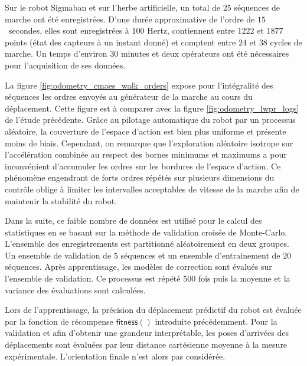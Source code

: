 Sur le robot Sigmaban et sur l'herbe artificielle, un total de $25$ séquences de marche
ont été enregistrées.
D'une durée approximative de l'ordre de $15$~secondes, elles sont enregistrées à $100$ Hertz, 
contiennent entre $1222$ et $1877$ points (état des capteurs à un instant donné) 
et comptent entre $24$ et $38$ cycles de marche.
Un temps d'environ $30$ minutes et deux opérateurs ont été nécessaires 
pour l'acquisition de ses données.

La figure \ref{fig:odometry_cmaes_walk_orders} expose pour l'intégralité 
des séquences les ordres envoyés au générateur de la marche au cours du déplacement.
Cette figure est à comparer avec la figure \ref{fig:odometry_lwpr_logs} de l'étude précédente.
Grâce au pilotage automatique du robot par un processus aléatoire, la couverture 
de l'espace d'action est bien plus uniforme et présente moins de biais.
Cependant, on remarque que l'exploration aléatoire isotrope sur l'accélération combinée
au respect des bornes minimums et maximums a pour inconvénient d'accumuler les ordres 
sur les bordures de l'espace d'action.
Ce phénomène engendrant de forts ordres répétés sur plusieurs dimensions du contrôle
oblige à limiter les intervalles acceptables de vitesse de la marche 
afin de maintenir la stabilité du robot.

Dans la suite, ce faible nombre de données est utilisé pour le calcul 
des statistiques en se basant sur la méthode de validation 
croisée de Monte-Carlo.
L'ensemble des enregistrements est partitionné aléatoirement en deux groupes.
Un ensemble de validation de $5$ séquences et un ensemble
d'entrainement de $20$ séquences.
Après apprentissage, les modèles de correction sont évalués sur l'ensemble 
de validation.
Ce processus est répété $500$ fois puis la moyenne et la variance 
des évaluations sont calculées.

Lors de l'apprentissage, la précision du déplacement prédictif
du robot est évaluée par la fonction de récompense $\mathsf{fitness}()$ 
introduite précédemment.
Pour la validation et afin d'obtenir une grandeur interprétable, 
les poses d'arrivées des déplacements sont évaluées par leur distance 
cartésienne moyenne à la mesure expérimentale. 
L'orientation finale n'est alors pas considérée.\\

